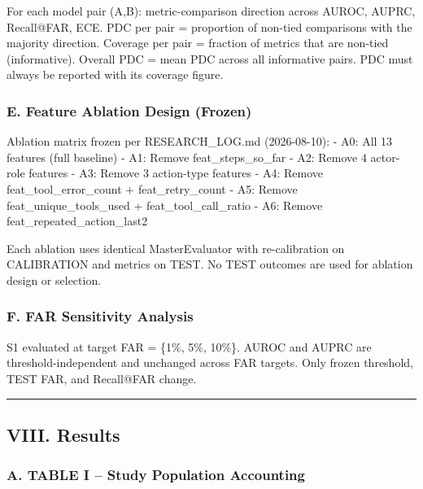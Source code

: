 \documentclass[
]{article}
\begin{document}
For each model pair (A,B): metric-comparison direction across AUROC,
AUPRC, Recall@FAR, ECE. PDC per pair = proportion of non-tied
comparisons with the majority direction. Coverage per pair = fraction of
metrics that are non-tied (informative). Overall PDC = mean PDC across
all informative pairs. PDC must always be reported with its coverage
figure.

\subsubsection{E. Feature Ablation Design
(Frozen)}\label{e.-feature-ablation-design-frozen}

Ablation matrix frozen per RESEARCH\_LOG.md (2026-08-10): - A0: All 13
features (full baseline) - A1: Remove feat\_steps\_so\_far - A2: Remove
4 actor-role features - A3: Remove 3 action-type features - A4: Remove
feat\_tool\_error\_count + feat\_retry\_count - A5: Remove
feat\_unique\_tools\_used + feat\_tool\_call\_ratio - A6: Remove
feat\_repeated\_action\_last2

Each ablation uses identical MasterEvaluator with re-calibration on
CALIBRATION and metrics on TEST. No TEST outcomes are used for ablation
design or selection.

\subsubsection{F. FAR Sensitivity
Analysis}\label{f.-far-sensitivity-analysis}

S1 evaluated at target FAR = \{1\%, 5\%, 10\%\}. AUROC and AUPRC are
threshold-independent and unchanged across FAR targets. Only frozen
threshold, TEST FAR, and Recall@FAR change.

\begin{center}\rule{0.5\linewidth}{0.5pt}\end{center}

\subsection{VIII. Results}\label{viii.-results}

\subsubsection{A. TABLE I -- Study Population
Accounting}\label{a.-table-i-study-population-accounting}
\end{document}

